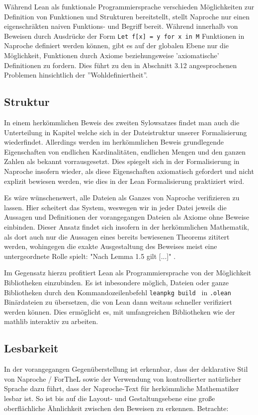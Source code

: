 \documentclass[a4paper,12pt]{scrartcl}
\begin{document}
Während Lean als funktionale Programmiersprache verschieden Möglichkeiten zur Definition von Funktionen und Strukturen bereitstellt, stellt Naproche nur einen eigenschräkten naiven Funktions- und Begriff bereit. Während innerhalb von Beweisen durch Ausdrücke der Form \lstset{language = ftl} \lstinline{Let f[x] = y for x in M} Funktionen in Naproche definiert werden können, gibt es auf der globalen Ebene nur die Möglichkeit, Funktionen durch Axiome beziehungsweise 'axiomatische' Definitionen zu fordern. Dies führt zu den in Abschnitt 3.12 angesprochenen Problemen hinsichtlich der ''Wohldefiniertheit''.

\subsection{Struktur}

In einem herkömmlichen Beweis \cite{bibtex.a} des zweiten Sylowsatzes findet man auch die Unterteilung in Kapitel welche sich in der Dateistruktur unserer Formalisierung wiederfindet. Allerdings werden im herkömmlichen Beweis grundlegende Eigenschaften von endlichen Kardinalitäten, endlichen Mengen und den ganzen Zahlen als bekannt vorrausgesetzt. Dies spiegelt sich in der Formalisierung in Naproche insofern wieder, als diese Eigenschaften axiomatisch gefordert und nicht explizit bewiesen werden, wie dies in der Lean Formalisierung praktiziert wird.

Es wäre wünschenswert, alle Dateien als Ganzes von Naproche verifizieren zu lassen. Hier scheitert das System, weswegen wir in jeder Datei jeweils die Aussagen und Definitionen der vorangegangen Dateien als Axiome ohne Beweise einbinden. Dieser Ansatz findet sich insofern in der herkömmlichen Mathematik, als dort auch nur die Aussagen eines bereits bewiesenen Theorems zititert werden, wohingegen die exakte Ausgestaltung des Beweises meist eine untergeordnete Rolle spielt: "Nach Lemma 1.5 gilt [...]" \cite{bibtex.a}.

Im Gegensatz hierzu profitiert Lean als Programmiersprache von der Möglichkeit Bibliotheken einzubinden. Es ist inbesondere möglich, Dateien oder ganze Bibliotheken durch den Kommandozeilenbefehl \verb!leanpkg build ! in  \verb!.olean! Binärdateien zu übersetzen, die von Lean dann weitaus schneller verifiziert werden können. Dies ermöglicht es, mit umfangreichen Bibliotheken wie der mathlib \cite{bibtex.d} interaktiv zu arbeiten.

\subsection{Lesbarkeit}
In der vorangegangen Gegenüberstellung ist erkennbar, dass der deklarative Stil von Naproche / ForTheL sowie der Verwendung von kontrollierter natürlicher Sprache dazu führt, dass der Naproche-Text für herkömmliche Mathematiker lesbar ist. So ist bis auf die Layout- und Gestaltungsebene eine große oberflächliche Ähnlichkeit zwischen den Beweisen zu erkennen.
Betrachte:
\medskip
\end{document}
